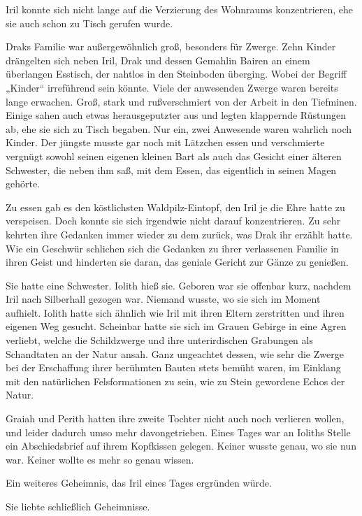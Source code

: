Iril konnte sich nicht lange auf die Verzierung des Wohnraums konzentrieren, ehe sie auch schon zu Tisch gerufen wurde.

Draks Familie war außergewöhnlich groß, besonders für Zwerge. Zehn Kinder drängelten sich neben Iril, Drak und dessen Gemahlin Bairen an einem überlangen Esstisch, der nahtlos in den Steinboden überging. Wobei der Begriff „Kinder“ irreführend sein könnte. Viele der anwesenden Zwerge waren bereits lange erwachen. Groß, stark und rußverschmiert von der Arbeit in den Tiefminen. Einige sahen auch etwas herausgeputzter aus und legten klappernde Rüstungen ab, ehe sie sich zu Tisch begaben. Nur ein, zwei Anwesende waren wahrlich noch Kinder. Der jüngste musste gar noch mit Lätzchen essen und verschmierte vergnügt sowohl seinen eigenen kleinen Bart als auch das Gesicht einer älteren Schwester, die neben ihm saß, mit dem Essen, das eigentlich in seinen Magen gehörte.

Zu essen gab es den köstlichsten Waldpilz-Eintopf, den Iril je die Ehre hatte zu verspeisen. Doch konnte sie sich irgendwie nicht darauf konzentrieren. Zu sehr kehrten ihre Gedanken immer wieder zu dem zurück, was Drak ihr erzählt hatte. Wie ein Geschwür schlichen sich die Gedanken zu ihrer verlassenen Familie in ihren Geist und hinderten sie daran, das geniale Gericht zur Gänze zu genießen.

Sie hatte eine Schwester. Iolith hieß sie. Geboren war sie offenbar kurz, nachdem Iril nach Silberhall gezogen war. Niemand wusste, wo sie sich im Moment aufhielt. Iolith hatte sich ähnlich wie Iril mit ihren Eltern zerstritten und ihren eigenen Weg gesucht. Scheinbar hatte sie sich im Grauen Gebirge in eine Agren verliebt, welche die Schildzwerge und ihre unterirdischen Grabungen als Schandtaten an der Natur ansah. Ganz ungeachtet dessen, wie sehr die Zwerge bei der Erschaffung ihrer berühmten Bauten stets bemüht waren, im Einklang mit den natürlichen Felsformationen zu sein, wie zu Stein gewordene Echos der Natur.

Graiah und Perith hatten ihre zweite Tochter nicht auch noch verlieren wollen, und leider dadurch umso mehr davongetrieben. Eines Tages war an Ioliths Stelle ein Abschiedsbrief auf ihrem Kopfkissen gelegen. Keiner wusste genau, wo sie nun war. Keiner wollte es mehr so genau wissen.

Ein weiteres Geheimnis, das Iril eines Tages ergründen würde.

Sie liebte schließlich Geheimnisse.



